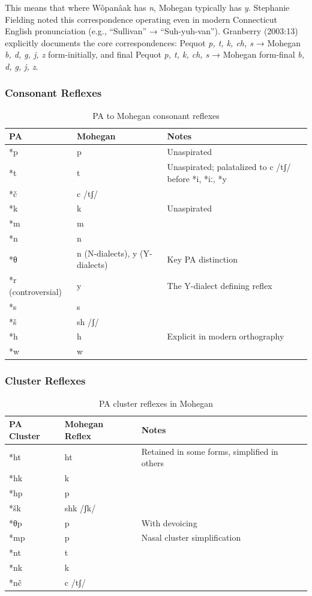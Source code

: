 This means that where Wôpanâak has \textit{n}, Mohegan typically has
\textit{y}. Stephanie Fielding noted this correspondence operating even in
modern Connecticut English pronunciation (e.g., ``Sullivan'' →
``Suh-yuh-van''). Granberry (2003:13) explicitly documents the core
correspondences: Pequot \textit{p, t, k, ch, s} → Mohegan \textit{b, d, g,
j, z} form-initially, and final Pequot \textit{p, t, k, ch, s} → Mohegan
form-final \textit{b, d, g, j, z}.

\subsubsection{Consonant Reflexes}

\begin{table}[h]
\centering
\begin{tabular}{lll}
\toprule
PA & Mohegan & Notes \\
\midrule
*p & p & Unaspirated \\
*t & t & Unaspirated; palatalized to c /tʃ/ before *i, *iː, *y \\
*č & c /tʃ/ & \\
*k & k & Unaspirated \\
*m & m & \\
*n & n & \\
*θ & n (N-dialects), y (Y-dialects) & Key PA distinction \\
*r (controversial) & y & The Y-dialect defining reflex \\
*s & s & \\
*š & sh /ʃ/ & \\
*h & h & Explicit in modern orthography \\
*w & w & \\
\bottomrule
\end{tabular}
\caption{PA to Mohegan consonant reflexes}
\label{tab:1364-pa-consonants}
\end{table}

\subsubsection{Cluster Reflexes}

\begin{table}[h]
\centering
\begin{tabular}{lll}
\toprule
PA Cluster & Mohegan Reflex & Notes \\
\midrule
*ht & ht & Retained in some forms, simplified in others \\
*hk & k & \\
*hp & p & \\
*šk & shk /ʃk/ & \\
*θp & p & With devoicing \\
*mp & p & Nasal cluster simplification \\
*nt & t & \\
*nk & k & \\
*nč & c /tʃ/ & \\
\bottomrule
\end{tabular}
\caption{PA cluster reflexes in Mohegan}
\label{tab:1364-clusters}
\end{table}

